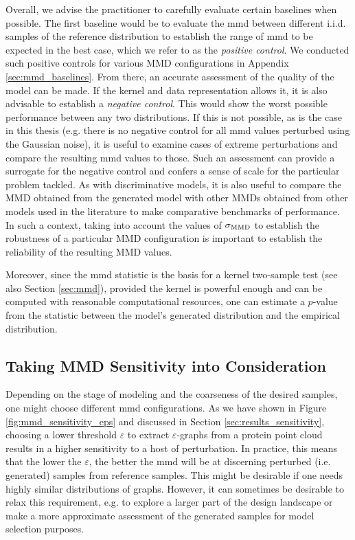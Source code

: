 Overall, we advise the practitioner to carefully evaluate certain baselines when
possible. The first baseline would be to evaluate the \acrshort{mmd} between
different i.i.d. samples of the reference distribution to establish the range of
\acrshort{mmd} to be expected in the best case, which we refer to as the
\emph{positive control}. We conducted such positive controls for various MMD
configurations in Appendix \ref{sec:mmd_baselines}. From there, an accurate
assessment of the quality of the model can be made. If the kernel and data
representation allows it, it is also advisable to establish a \emph{negative
control}. This would show the worst possible performance between any two
distributions. If this is not possible, as is the case in this thesis (e.g.
there is no negative control for all \acrshort{mmd} values perturbed using the
Gaussian noise), it is useful to examine cases of extreme perturbations and
compare the resulting \acrshort{mmd} values to those. Such an assessment can
provide a surrogate for the negative control and confers a sense of scale for
the particular problem tackled. As with discriminative models, it is also useful
to compare the MMD obtained from the generated model with other MMDs obtained
from other models used in the literature to make comparative benchmarks of
performance. In such a context, taking into account the values of $\sigma_{\text{MMD}}$
to establish the robustness of a particular MMD configuration is important to
establish the reliability of the resulting MMD values.

Moreover, since the \acrshort{mmd} statistic is the basis for a kernel
two-sample test \citep{gretton2012kernel} (see also Section \ref{sec:mmd}),
provided the kernel is powerful enough and can be computed with reasonable
computational resources, one can estimate a $p$-value from the statistic between
the model's generated distribution and the empirical distribution.

\subsection{Taking MMD Sensitivity into Consideration}\label{sec:discussion_right_mmd}
Depending on the stage of modeling and the coarseness of the desired samples,
one might choose different \acrshort{mmd} configurations. As we have shown in Figure
\ref{fig:mmd_sensitivity_eps} and discussed in Section
\ref{sec:results_sensitivity}, choosing a lower threshold $\varepsilon$ to
extract $\varepsilon$-graphs from a protein point cloud results in a higher
sensitivity to a host of perturbation. In practice, this means that the lower the
$\varepsilon$, the better the \acrshort{mmd} will be at discerning perturbed (i.e.
generated) samples from reference samples. This might be desirable if one needs
highly similar distributions of graphs. However, it can sometimes be desirable
to relax this requirement, e.g. to explore a larger part of the design landscape
or make a more approximate assessment of the generated samples for model selection purposes.

